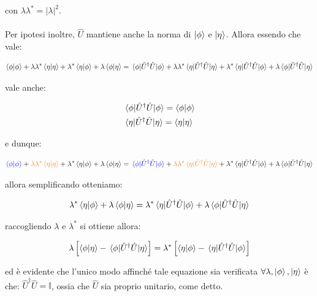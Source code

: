 	con $\lambda \lambda^* = |\lambda|^2$.
	\\
	\\
	Per ipotesi inoltre, $\hat{U}$ mantiene anche la norma di $\ket{\phi}$ e $\ket{\eta}$. Allora essendo che vale:

\begin{align*}
	\braket{\phi} + \lambda \lambda^* \braket{\eta} + \lambda^* \braket{\eta}{\phi} + \lambda\braket{\phi}{\eta} = \mel{\phi}{\hat{U}^{\dagger}\hat{U}}{\phi} + \lambda \lambda^* \mel{\eta}{\hat{U}^{\dagger}\hat{U}}{\eta} + \lambda^* \mel{\eta}{\hat{U}^{\dagger}\hat{U}}{\phi} + \lambda \mel{\phi}{\hat{U}^{\dagger}\hat{U}}{\eta}
\end{align*}

	vale anche:
	
\begin{align*}
	& \mel{\phi}{\hat{U}^{\dagger}\hat{U}}{\phi} = \braket{\phi} \\
	& \mel{\eta}{\hat{U}^{\dagger}\hat{U}}{\eta} = \braket{\eta}
\end{align*}

	e dunque:

\begin{align*}
	\textcolor{blue}{\braket{\phi}} + \textcolor{orange}{ \lambda \lambda^* \braket{\eta} } + \lambda^* \braket{\eta}{\phi} + \lambda\braket{\phi}{\eta} = \textcolor{blue}{\mel{\phi}{\hat{U}^{\dagger}\hat{U}}{\phi}} + \textcolor{orange}{\lambda \lambda^* \mel{\eta}{\hat{U}^{\dagger}\hat{U}}{\eta} }+ \lambda^* \mel{\eta}{\hat{U}^{\dagger}\hat{U}}{\phi} + \lambda \mel{\phi}{\hat{U}^{\dagger}\hat{U}}{\eta}
\end{align*}

	allora semplificando otteniamo:
	
\begin{align*}
	\lambda^* \braket{\eta}{\phi} + \lambda\braket{\phi}{\eta} = \lambda^* \mel{\eta}{\hat{U}^{\dagger}\hat{U}}{\phi} + \lambda \mel{\phi}{\hat{U}^{\dagger}\hat{U}}{\eta}
\end{align*}

	raccogliendo $\lambda$ e $\lambda^*$ si ottiene allora:
	
\begin{align*}
	\lambda \, \qty\Big[ \braket{\phi}{\eta} - \mel{\phi}{\hat{U}^{\dagger}\hat{U}}{\eta}  ] = \lambda^* \,  \qty\Big[ \braket{\eta}{\phi} - \mel{\eta}{\hat{U}^{\dagger}\hat{U}}{\phi}  ] 
\end{align*}

	ed è evidente che l'unico modo affinché tale equazione sia verificata $\forall \lambda, \ket{\phi}, \ket{\eta}$ è che: $\hat{U}^{\dagger}\hat{U} = \mathbb{I}$, ossia che $\hat{U}$ sia proprio unitario, come detto.

